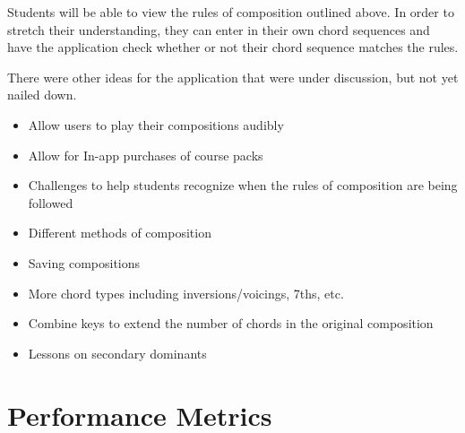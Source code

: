 \documentclass[onecolumn, draftclsnofoot,10pt, compsoc]{IEEEtran}
\begin{document}
    \par
    Students will be able to view the rules of composition outlined above.
    In order to stretch their understanding, they can enter in their own chord sequences and have the application check whether or not their chord sequence matches the rules.
    
    \par
    There were other ideas for the application that were under discussion, but not yet nailed down.
    \begin{itemize}
    \item Allow users to play their compositions audibly
    \item Allow for In-app purchases of course packs
    \item Challenges to help students recognize when the rules of composition are being followed
    \item Different methods of composition
    \item Saving compositions
    \item More chord types including inversions/voicings, 7ths, etc.
    \item Combine keys to extend the number of chords in the original composition
    \item Lessons on secondary dominants
    \end {itemize}
    \clearpage
    
    \section{Performance Metrics}
    
\end{document}
